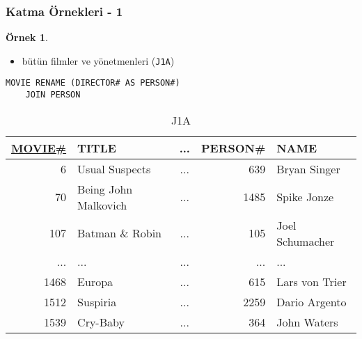 \documentclass[dvipsnames]{beamer}
\theoremstyle{definition}
\theoremstyle{example}
\newtheorem{ornek}[theorem]{Örnek}
\theoremstyle{plain}
\begin{document}
\begin{frame}[fragile]
  \frametitle{Katma Örnekleri - 1}

  \begin{ornek}
    \begin{itemize}
      \item bütün filmler ve yönetmenleri (\texttt{J1A})
    \end{itemize}

    \begin{lstlisting}
MOVIE RENAME (DIRECTOR# AS PERSON#)
    JOIN PERSON
    \end{lstlisting}

    \pause
    \vspace{-10pt}
    \begin{tiny}
    \begin{table}
      \caption{J1A}
      \begin{tabular}{|r|l|c|r|l|}\hline
\underline{MOVIE\#} & TITLE & ... & PERSON\# & NAME            \\[2pt]\hline\hline
   6 & Usual Suspects       & ... &     639  & Bryan Singer    \\\hline
  70 & Being John Malkovich & ... &    1485  & Spike Jonze     \\\hline
 107 & Batman \& Robin      & ... &     105  & Joel Schumacher \\\hline
 ... & ...                  & ... &     ...  & ...             \\\hline
1468 & Europa               & ... &     615  & Lars von Trier  \\\hline
1512 & Suspiria             & ... &    2259  & Dario Argento   \\\hline
1539 & Cry-Baby             & ... &     364  & John Waters     \\\hline
      \end{tabular}
    \end{table}
    \end{tiny}
  \end{ornek}
\end{frame}
\end{document}
